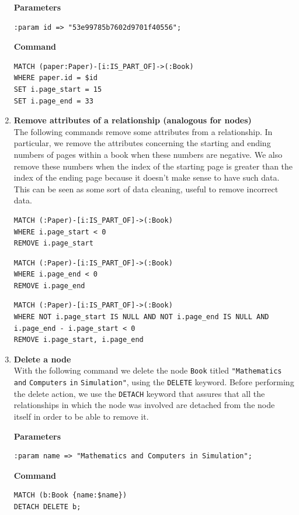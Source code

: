 \begin{enumerate}
    \textbf{Parameters}
    \begin{lstlisting}[label={lst:parameters_command4neo4j}]
:param id => "53e99785b7602d9701f40556";
    \end{lstlisting}
    \textbf{Command}
    \begin{lstlisting}[label={lst:command4neo4j}]
MATCH (paper:Paper)-[i:IS_PART_OF]->(:Book)
WHERE paper.id = $id
SET i.page_start = 15
SET i.page_end = 33
    \end{lstlisting}
    \item \textbf{Remove attributes of a relationship (analogous for nodes)} \\
    The following commands remove some attributes from a relationship.
    In particular, we remove the attributes concerning the starting and ending numbers of pages within a book when these numbers are negative.
    We also remove these numbers when the index of the starting page is greater than the index of the ending page because it doesn't make sense to have such data.
    This can be seen as some sort of data cleaning, useful to remove incorrect data.
    \begin{lstlisting}[label={lst:command5neo4j1}]
MATCH (:Paper)-[i:IS_PART_OF]->(:Book)
WHERE i.page_start < 0
REMOVE i.page_start
    \end{lstlisting}
    \begin{lstlisting}[label={lst:command5neo4j2}]
MATCH (:Paper)-[i:IS_PART_OF]->(:Book)
WHERE i.page_end < 0
REMOVE i.page_end
    \end{lstlisting}
    \begin{lstlisting}[label={lst:command5neo4j3}]
MATCH (:Paper)-[i:IS_PART_OF]->(:Book)
WHERE NOT i.page_start IS NULL AND NOT i.page_end IS NULL AND i.page_end - i.page_start < 0
REMOVE i.page_start, i.page_end
    \end{lstlisting}
    \item \textbf{Delete a node} \\
    With the following command we delete the node \verb|Book| titled \verb|"Mathematics| \verb|and| \verb|Computers| \verb|in| \verb|Simulation"|, using the \verb|DELETE| keyword.
    Before performing the delete action, we use the \verb|DETACH| keyword that assures that all the relationships in which the node was involved are detached from the node itself in order to be able to remove it.

    \textbf{Parameters}
    \begin{lstlisting}[label={lst:parameters_command6neo4j}]
:param name => "Mathematics and Computers in Simulation";
    \end{lstlisting}
    \textbf{Command}
    \begin{lstlisting}[label={lst:command6neo4j}]
MATCH (b:Book {name:$name})
DETACH DELETE b;
    \end{lstlisting}
\end{enumerate}


